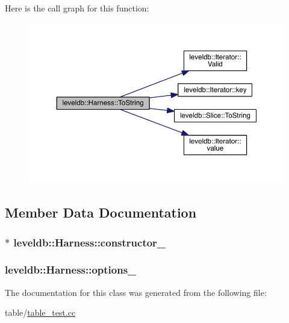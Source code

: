 Here is the call graph for this function\+:\nopagebreak
\begin{figure}[H]
\begin{center}
\leavevmode
\includegraphics[width=350pt]{classleveldb_1_1_harness_a1cdf351918a2e969bce1c29290317403_cgraph}
\end{center}
\end{figure}




\subsection{Member Data Documentation}
\hypertarget{classleveldb_1_1_harness_a04b2410b1da9c47dd78240702e68c826}{}
\subsubsection[{constructor\+\_\+}]{$\ast$ leveldb\+::\+Harness\+::constructor\+\_\+\hspace{0.3cm}{\ttfamily [private]}}\label{classleveldb_1_1_harness_a04b2410b1da9c47dd78240702e68c826}
\hypertarget{classleveldb_1_1_harness_a503838bed7ecbdec2d06f577e54f522c}{}
\subsubsection[{options\+\_\+}]{ leveldb\+::\+Harness\+::options\+\_\+\hspace{0.3cm}{\ttfamily [private]}}\label{classleveldb_1_1_harness_a503838bed7ecbdec2d06f577e54f522c}


The documentation for this class was generated from the following file\+:\begin{DoxyCompactItemize}
\item 
table/\hyperlink{table__test_8cc}{table\+\_\+test.\+cc}\end{DoxyCompactItemize}
